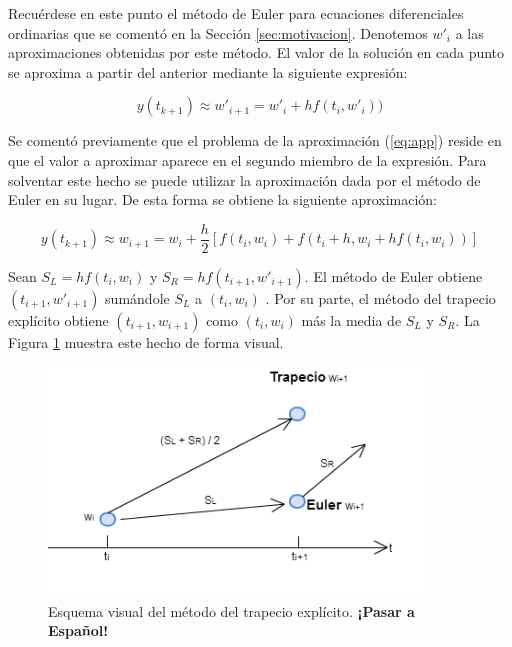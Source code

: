 \documentclass{article}
\theoremstyle{theorem-style}  %
\theoremstyle{definition}
\theoremstyle{example-style}
\begin{document}
		Recuérdese en este punto el método de Euler para ecuaciones diferenciales ordinarias que se comentó en la Sección \ref{sec:motivacion}. Denotemos $w'_i$ a las aproximaciones obtenidas por este método. El valor de la solución en cada punto se aproxima a partir del anterior mediante la siguiente expresión:
		
		\begin{equation*} \label{eq:euler}
			y(t_{k+1}) \approx w'_{i+1} = w'_i + h f(t_i,w'_i))
		\end{equation*}

		Se comentó previamente que el problema de la aproximación (\ref{eq:app}) reside en que el valor a aproximar aparece en el segundo miembro de la expresión. Para solventar este hecho se puede utilizar la aproximación dada por el método de Euler en su lugar. De esta forma se obtiene la siguiente aproximación:

		\begin{equation} \label{eq:app-exp}
			y(t_{k+1}) \approx w_{i+1} = w_i + \frac{h}{2} \left[f(t_i,w_i) + f(t_{i}+h, w_i + h f(t_i,w_i))\right]
		\end{equation}

		Sean $S_L = h f(t_i,w_i) $ y $S_R = h f(t_{i+1}, w'_{i+1})$. El método de Euler  obtiene $(t_{i+1}, w'_{i+1})$ sumándole $S_L$ a $(t_{i}, w_{i})$ . Por su parte, el método del trapecio explícito obtiene $(t_{i+1}, w_{i+1})$ como $(t_{i}, w_{i})$ más la media de $S_L$ y $S_R$. La Figura \ref{fig:trapecio-vs-euler} muestra este hecho de forma visual.
			
		\begin{figure}[H]
			\centering
			\includegraphics[width=10cm]{./Images/trapecio-vs-euler.png}
			\caption{Esquema visual del método del trapecio explícito. \textbf{¡Pasar a Español!}} 
			\label{fig:trapecio-vs-euler}
		\end{figure}

\end{document}
